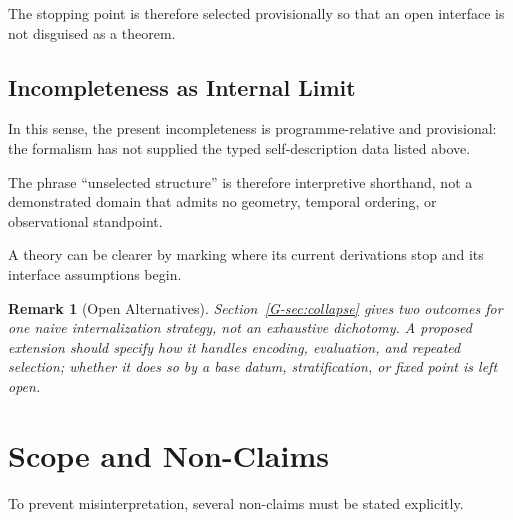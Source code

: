 \documentclass[12pt,a4paper,openany]{book}
\newtheorem{remark}[theorem]{Remark}
\begin{document}
The stopping point is therefore selected provisionally so that an open interface is not disguised as a theorem.

\subsection{Incompleteness as Internal Limit}

In this sense, the present incompleteness is programme-relative and provisional: the formalism has not supplied the typed self-description data listed above.

The phrase ``unselected structure'' is therefore interpretive shorthand, not a demonstrated domain that admits no geometry, temporal ordering, or observational standpoint.

A theory can be clearer by marking where its current derivations stop and its interface assumptions begin.

\begin{remark}[Open Alternatives]
Section~\ref{G-sec:collapse} gives two outcomes for one naive internalization strategy, not an exhaustive dichotomy.  A proposed extension should specify how it handles encoding, evaluation, and repeated selection; whether it does so by a base datum, stratification, or fixed point is left open.
\end{remark}

\section{Scope and Non-Claims}
\label{G-sec:nonclaims}

To prevent misinterpretation, several non-claims must be stated explicitly.
\end{document}
